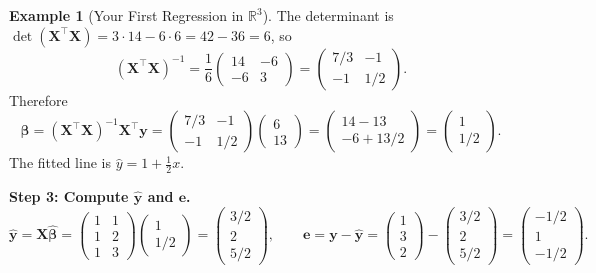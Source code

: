 \documentclass[11pt,a4paper]{article}
\theoremstyle{plain}
\theoremstyle{definition}
\newtheorem{example}[theorem]{Example}
\newcommand{\R}{\mathbb{R}}
\newcommand{\yhat}{\hat{\bm{y}}}
\newcommand{\bhat}{\hat{\bm{\beta}}}
\newcommand{\bX}{\bm{X}}
\newcommand{\by}{\bm{y}}
\newcommand{\be}{\bm{e}}
\begin{document}
\begin{example}[Your First Regression in $\R^3$]
The determinant is $\det(\bX^\top\bX) = 3\cdot 14 - 6\cdot 6 = 42 - 36 = 6$, so
\[
(\bX^\top\bX)^{-1}
= \frac{1}{6}\begin{pmatrix} 14 & -6 \\ -6 & 3 \end{pmatrix}
= \begin{pmatrix} 7/3 & -1 \\ -1 & 1/2 \end{pmatrix}.
\]
Therefore
\[
\bhat = (\bX^\top\bX)^{-1}\bX^\top\by
= \begin{pmatrix} 7/3 & -1 \\ -1 & 1/2 \end{pmatrix}
  \begin{pmatrix} 6 \\ 13 \end{pmatrix}
= \begin{pmatrix} 14 - 13 \\ -6 + 13/2 \end{pmatrix}
= \begin{pmatrix} 1 \\ 1/2 \end{pmatrix}.
\]
The fitted line is $\hat{y} = 1 + \tfrac{1}{2}x$.

\medskip\noindent\textbf{Step 3: Compute $\yhat$ and $\be$.}
\[
\yhat = \bX\bhat
= \begin{pmatrix} 1 & 1 \\ 1 & 2 \\ 1 & 3 \end{pmatrix}
  \begin{pmatrix} 1 \\ 1/2 \end{pmatrix}
= \begin{pmatrix} 3/2 \\ 2 \\ 5/2 \end{pmatrix}, \qquad
\be = \by - \yhat
= \begin{pmatrix} 1 \\ 3 \\ 2 \end{pmatrix} - \begin{pmatrix} 3/2 \\ 2 \\ 5/2 \end{pmatrix}
= \begin{pmatrix} -1/2 \\ 1 \\ -1/2 \end{pmatrix}.
\]


\end{example}
\end{document}
